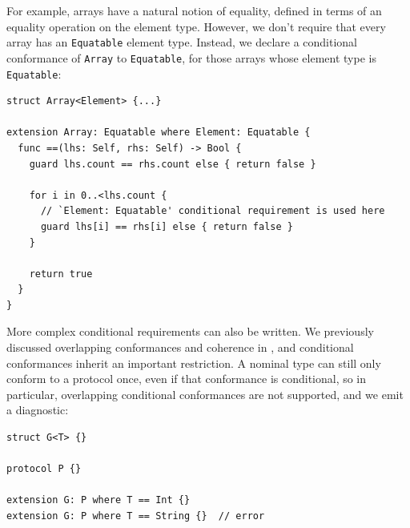 \documentclass[../generics]{subfiles}
\begin{document}
For example, arrays have a natural notion of equality, defined in terms of an equality operation on the element type. However, we don't require that every array has an \texttt{Equatable} element type. Instead, we declare a conditional conformance of \texttt{Array} to \texttt{Equatable}, for those arrays whose element type is \texttt{Equatable}:
\begin{Verbatim}
struct Array<Element> {...}

extension Array: Equatable where Element: Equatable {
  func ==(lhs: Self, rhs: Self) -> Bool {
    guard lhs.count == rhs.count else { return false }

    for i in 0..<lhs.count {
      // `Element: Equatable' conditional requirement is used here
      guard lhs[i] == rhs[i] else { return false }
    }

    return true
  }
}
\end{Verbatim}
More complex conditional requirements can also be written. We previously discussed overlapping conformances and coherence in , and conditional conformances inherit an important restriction. A nominal type can still only conform to a protocol once, even if that conformance is conditional, so in particular, overlapping conditional conformances are not supported, and we emit a diagnostic:
\begin{Verbatim}
struct G<T> {}

protocol P {}

extension G: P where T == Int {}
extension G: P where T == String {}  // error
\end{Verbatim}
\end{document}
